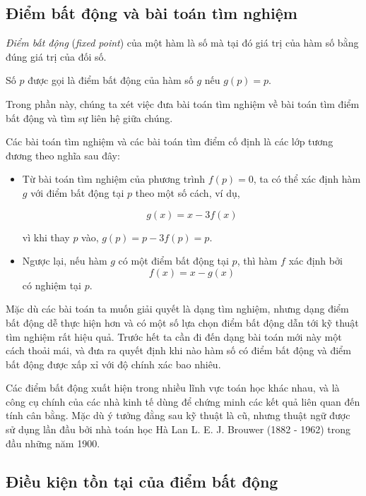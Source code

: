 \documentclass[../../Lectures]{subfiles}
\begin{document}
\subsection{Điểm bất động và bài toán tìm nghiệm}

\emph{Điểm bất động} (\emph{fixed point}) của một hàm là số mà tại đó giá trị
của hàm số bằng đúng giá trị của đối số.

\begin{definition}
    Số \(p\) được gọi là điểm bất động của hàm số \(g\) nếu \(g(p) = p\).
\end{definition}

Trong phần này, chúng ta xét việc đưa bài toán tìm nghiệm về bài toán tìm điểm
bất động và tìm sự liên hệ giữa chúng.

Các bài toán tìm nghiệm và các bài toán tìm điểm cố định là các lớp tương đương
theo nghĩa sau đây:
\begin{itemize}
    \item Từ bài toán tìm nghiệm của phương trình \(f(p) = 0\), ta có thể xác
        định hàm \(g\) với điểm bất động tại \(p\) theo một số cách, ví dụ,

        \[g(x) = x - 3f(x)\]

        vì khi thay \(p\) vào, \(g(p) = p - 3f(p) = p\).

    \item Ngược lại, nếu hàm \(g\) có một điểm bất động tại \(p\), thì hàm \(f\)
        xác định bởi \[f(x) = x - g(x)\] có nghiệm tại \(p\).
\end{itemize}

Mặc dù các bài toán ta muốn giải quyết là dạng tìm nghiệm, nhưng dạng điểm bất
động dễ thực hiện hơn và có một số lựa chọn điểm bất động dẫn tới kỹ thuật tìm
nghiệm rất hiệu quả. Trước hết ta cần đi đến dạng bài toán mới này một cách
thoải mái, và đưa ra quyết định khi nào hàm số có điểm bất động và điểm bất động
được xấp xỉ với độ chính xác bao nhiêu.

Các điểm bất động xuất hiện trong nhiều lĩnh vực toán học khác nhau, và là công
cụ chính của các nhà kinh tế dùng để chứng minh các kết quả liên quan đến tính
cân bằng. Mặc dù ý tưởng đằng sau kỹ thuật là cũ, nhưng thuật ngữ được sử dụng
lần đầu bởi nhà toán học Hà Lan L. E. J. Brouwer (1882 - 1962) trong đầu những
năm 1900.

\subsection{Điều kiện tồn tại của điểm bất động}
\end{document}
